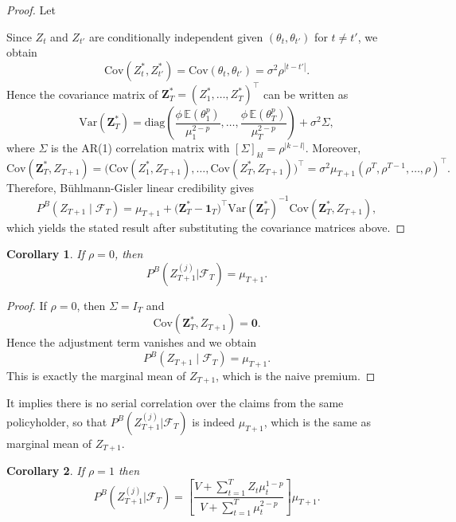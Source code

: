 \documentclass{sfuthesis}
\numberwithin{equation}{chapter}
\newtheorem{corollary}{Corollary}
\begin{document}
\begin{proof}


\color{black}  Let

Since \(Z_t\) and \(Z_{t'}\) are conditionally independent given \((\theta_t,\theta_{t'})\) for \(t\neq t'\), we obtain
\[
\mathrm{Cov}(Z_t^*,Z_{t'}^*)
=\mathrm{Cov}(\theta_t,\theta_{t'})
=\sigma^2\rho^{|t-t'|}.
\]
Hence the covariance matrix of \(\bm{Z}_T^*=(Z_1^*,\dots,Z_T^*)^\top\) can be written as
\[
\mathrm{Var}(\bm{Z}_T^*)
=
\mathrm{diag}\!\left(\frac{\phi\,\mathbb{E}(\theta_1^p)}{\mu_1^{2-p}},\dots,\frac{\phi\,\mathbb{E}(\theta_T^p)}{\mu_T^{2-p}}\right)
+\sigma^2\Sigma,
\]
where \(\Sigma\) is the AR(1) correlation matrix with \([\Sigma]_{kl}=\rho^{|k-l|}\). Moreover,
\[
\mathrm{Cov}(\bm{Z}_T^*,Z_{T+1})
=
\big(\mathrm{Cov}(Z_1^*,Z_{T+1}),\dots,\mathrm{Cov}(Z_T^*,Z_{T+1})\big)^\top
=\sigma^2\mu_{T+1}(\rho^T,\rho^{T-1},\dots,\rho)^\top.
\]
Therefore, Bühlmann-Gisler linear credibility gives
\[
P^B(Z_{T+1}\mid\mathcal{F}_T)
=
\mu_{T+1}
+
\big(\bm{Z}_T^*-\mathbf{1}_T\big)^\top
\mathrm{Var}(\bm{Z}_T^*)^{-1}
\mathrm{Cov}(\bm{Z}_T^*,Z_{T+1}),
\]
which yields the stated result after substituting the covariance matrices above. 
\end{proof}

\begin{corollary}
If $\rho=0$, then
$$
P^B(Z_{T+1}^{(j)}|\mathcal{F}_T)= \mu_{T+1}.
$$
\end{corollary}
\begin{proof}


\color{black} If \(\rho=0\), then \(\Sigma=I_T\) and
\[
\mathrm{Cov}(\bm{Z}_T^*,Z_{T+1})=\mathbf{0}.
\]
Hence the adjustment term vanishes and we obtain
\[
P^B(Z_{T+1}\mid\mathcal{F}_T)=\mu_{T+1}.
\]
This is exactly the marginal mean of \(Z_{T+1}\), which is the naive premium. 

\end{proof}

It implies there is no serial correlation over the claims from the same policyholder, so that $P^B(Z_{T+1}^{(j)}|\mathcal{F}_T)$ is indeed $\mu_{T+1}$, which is the same as marginal mean of $Z_{T+1}$.

\begin{corollary}
If $\rho=1$ then 
$$
P^B(Z_{T+1}^{(j)}|\mathcal{F}_T)=\left[\frac{V + \sum_{t=1}^T Z_t \mu_t^{1-p}}{V + \sum_{t=1}^T \mu_t^{2-p}}\right] \mu_{T+1}.
$$
\end{corollary}
\end{document}
